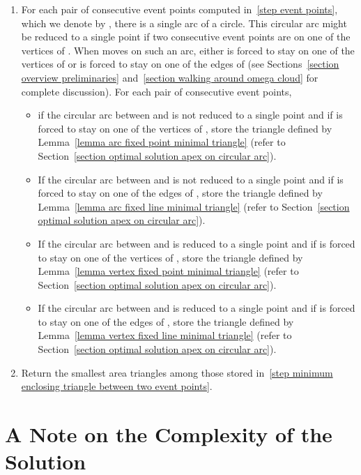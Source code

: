 \documentclass[11pt, oneside]{article}
\begin{document}
\begin{algorithm}
\begin{enumerate}
\item\label{step minimum enclosing triangle between two event points}
For each pair of consecutive event points
computed in~\ref{step event points},
which we denote by ,
there is a single arc of a circle.
This circular arc 
might be reduced to a single point
if two consecutive event points 
are on one of the vertices of .
When  moves on such an arc,
either  is forced to stay 
on one of the vertices of 
or  is forced to stay on one of the edges of 
(see Sections~\ref{section overview preliminaries}
and~\ref{section walking around omega cloud}
for complete discussion).
For each pair  of consecutive event points,
\begin{itemize}
\item if the circular arc between  and  
is not reduced to a single point
and if  is forced to stay 
on one of the vertices of ,
store the triangle defined by Lemma~\ref{lemma arc fixed point minimal triangle}
(refer to Section~\ref{section optimal solution apex on circular arc}).

\item If the circular arc between  and  
is not reduced to a single point
and if  is forced to stay 
on one of the edges of ,
store the triangle defined by Lemma~\ref{lemma arc fixed line minimal triangle}
(refer to Section~\ref{section optimal solution apex on circular arc}).

\item If the circular arc between  and  
is reduced to a single point
and if  is forced to stay 
on one of the vertices of ,
store the triangle defined by Lemma~\ref{lemma vertex fixed point minimal triangle}
(refer to Section~\ref{section optimal solution apex on circular arc}).

\item If the circular arc between  and  
is reduced to a single point
and if  is forced to stay 
on one of the edges of ,
store the triangle defined by Lemma~\ref{lemma vertex fixed line minimal triangle}
(refer to Section~\ref{section optimal solution apex on circular arc}).
\end{itemize}

\item Return the smallest area triangles among those stored
in~\ref{step minimum enclosing triangle between two event points}.
\end{enumerate}
\end{algorithm}




\section{A Note on the Complexity of the Solution}
\label{section complexity solution}
\end{document}

